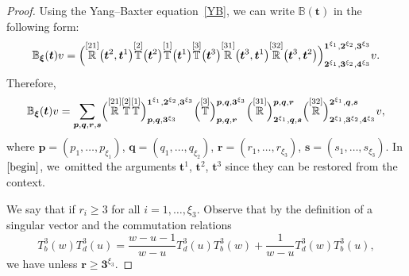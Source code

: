 \documentclass[pdftex]{sigma}
\numberwithin{equation}{section}
\begin{document}
\begin{proof}
Using the Yang--Baxter equation~\eqref{YB}, we can write ${\mathbb{B}}(\boldsymbol{t})$ in the following form:
\begin{equation*}%
{\mathbb{B}}_{\boldsymbol{\xi}}(\boldsymbol{t})v=\Bigl( \overset{[21]}{\mathbb{R}}\bigl(\boldsymbol{t}^2,\boldsymbol{t}^1\bigr)\overset{[2]}{\mathbb{T}}\bigl(\boldsymbol{t}^2\bigr)\overset{[1]}{\mathbb{T}}\bigl(\boldsymbol{t}^1\bigr) \overset{[3]}{\mathbb{T}}\bigl(\boldsymbol{t}^3\bigr)\overset{[31]}{\mathbb{R}}\bigl(\boldsymbol{t}^3,\boldsymbol{t}^1\bigr)\overset{[32]}{\mathbb{R}} \bigl(\boldsymbol{t}^3,\boldsymbol{t}^2\bigr)\Bigr)^{\boldsymbol{1}^{\xi_1}, \boldsymbol{2}^{\xi_2}, \boldsymbol{3}^{\xi_3}}_{\boldsymbol{2}^{\xi_1}, \boldsymbol{3}^{\xi_2}, \boldsymbol{4}^{\xi_3}}v.
\end{equation*}
Therefore,
\begin{equation}\label{begin}
{\mathbb{B}}_{\boldsymbol{\xi}}(\boldsymbol{t})v=\sum_{\boldsymbol{p},\boldsymbol{q},\boldsymbol{r},\boldsymbol{s}}\Bigl( \overset{[21]}{\mathbb{R}} \overset{[2]}{\mathbb{T}} \overset{[1]}{\mathbb{T}} \Big)^{\boldsymbol{1}^{\xi_1},\boldsymbol{2}^{\xi_2}, \boldsymbol{3}^{\xi_3}}_{\boldsymbol{p},\boldsymbol{q},\boldsymbol{3}^{\xi_3}} \Bigl( \overset{[3]}{\mathbb{T}} \Big)^{\boldsymbol{p},\boldsymbol{q},\boldsymbol{3}^{\xi_3}}_{\boldsymbol{p},\boldsymbol{q},\boldsymbol{r}} \Bigl(\overset{[31]}{\mathbb{R}} \Big)^{\boldsymbol{p},\boldsymbol{q},\boldsymbol{r}}_{\boldsymbol{2}^{\xi_1},\boldsymbol{q},\boldsymbol{s}} \Bigl( \overset{[32]}{\mathbb{R}} \Big)^{\boldsymbol{2}^{\xi_1},\boldsymbol{q},\boldsymbol{s}}_{\boldsymbol{2}^{\xi_1},\boldsymbol{3}^{\xi_2},\boldsymbol{4}^{\xi_3}}v,
\end{equation}
where $\boldsymbol{p}=(p_1,\dots, p_{\xi_1})$, $\boldsymbol{q}=(q_1,\dots, q_{\xi_2})$, $\boldsymbol{r}=(r_1,\dots, r_{\xi_3})$, $\boldsymbol{s}=(s_1,\dots, s_{\xi_3})$. In $\eqref{begin}$, we~omitted the arguments $\boldsymbol{t}^{1}$, $\boldsymbol{t}^{2}$, $\boldsymbol{t}^{3}$ since they can be restored from the context.

We say that  if $r_i\geq 3$ for all $i=1,\dots, \xi_3$. Observe that by the definition of a singular vector and the commutation relations
\begin{equation*}
T^{3}_b(w)T^3_d(u)=\frac{w-u-1}{w-u} T^3_d(u)T^3_b(w)+\frac{1}{w-u}T^3_d(w)T^3_b(u),
\end{equation*}
we have  unless $\boldsymbol{r}\geq \boldsymbol{3}^{\xi_3}$.


\end{proof}
\end{document}
